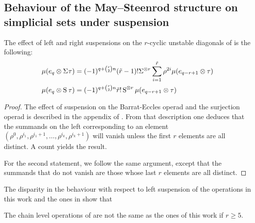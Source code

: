 \subsection{Behaviour of the May--Steenrod structure on simplicial sets under suspension}\label{s:suspension} 
\begin{proposition}\label{prop:suspensionunstable}
	The effect of left and right suspensions on the $r$-cyclic unstable diagonals of \cite{medina2021may_st} is the following:
	\begin{align*}
		\mu(e_q \otimes \Sigma^{} \tau) &= (-1)^{q+\binom{r}{2}n}(\tilde{r}-1)!\Sigma^{\otimes r}\sum_{i=1}^{\tilde{r}} \rho^{2i}\mu(e_{q-r+1} \otimes \tau)
		\\
		\mu(e_q \otimes \operatorname{S}^{}\tau) &= (-1)^{q+\binom{r}{2}n}\tilde{r}!\operatorname{S}^{\otimes r}\mu(e_{q-r+1} \otimes \tau)
	\end{align*}
\end{proposition}

\begin{proof}
	The effect of suspension on the Barrat-Eccles operad and the surjection operad is described in the appendix of \cite{berger2004combinatorial}. From that description one deduces that the summands on the left corresponding to an element $(\rho^0,\rho^{i_1},\rho^{i_1+1},\dots,\rho^{i_k},\rho^{i_k+1})$ will vanish unless the first $r$ elements are all distinct. A count yields the result.
	
	For the second statement, we follow the same argument, except that the summands that do not vanish are those whose last $r$ elements are all distinct.
\end{proof}


The disparity in the behaviour with respect to left suspension of the operations in this work and the ones in \cite{medina2021may_st} show that

\begin{corollary}
	The chain level operations of \cite{medina2021may_st} are not the same as the ones of this work if $r\geq 5$.
\end{corollary}




